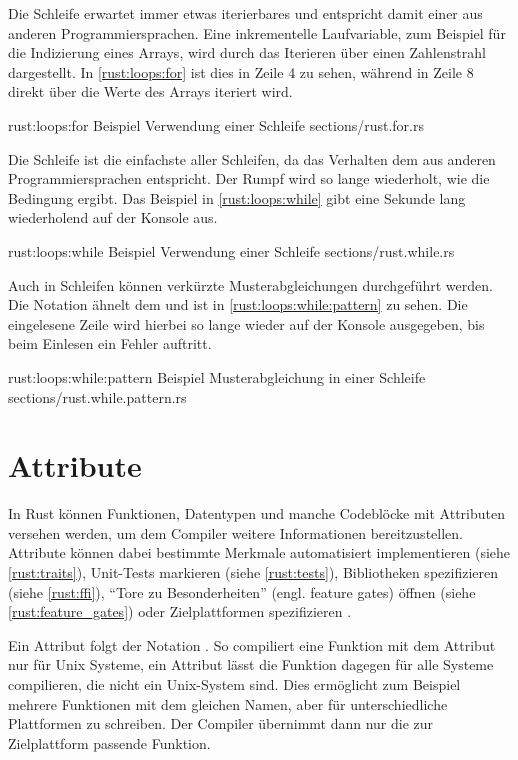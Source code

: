 Die  Schleife erwartet immer etwas iterierbares und entspricht damit einer  aus anderen Programmiersprachen.
Eine inkrementelle Laufvariable, zum Beispiel für die Indizierung eines Arrays, wird durch das Iterieren über einen Zahlenstrahl dargestellt.
In \autoref{rust:loops:for} ist dies in Zeile 4 zu sehen, während in Zeile 8 direkt über die Werte des Arrays iteriert wird.

\rustcinclude
	{rust:loops:for}
	{Beispiel Verwendung einer  Schleife}
	{sections/rust.for.rs}


Die  Schleife ist die einfachste aller Schleifen, da das Verhalten dem aus anderen Programmiersprachen entspricht.
Der Rumpf wird so lange wiederholt, wie die Bedingung  ergibt.
Das Beispiel in \autoref{rust:loops:while} gibt eine Sekunde lang wiederholend  auf der Konsole aus.


\rustcinclude
	{rust:loops:while}
	{Beispiel Verwendung einer  Schleife}
	{sections/rust.while.rs}

Auch in  Schleifen können verkürzte Musterabgleichungen durchgeführt werden.
Die Notation ähnelt dem  und ist in \autoref{rust:loops:while:pattern} zu sehen.
Die eingelesene Zeile wird hierbei so lange wieder auf der Konsole ausgegeben, bis beim Einlesen ein Fehler auftritt.

\rustcinclude
	{rust:loops:while:pattern}
	{Beispiel Musterabgleichung in einer  Schleife}
	{sections/rust.while.pattern.rs}

\section{Attribute}
\label{rust:attributes}

In Rust können Funktionen, Datentypen und manche Codeblöcke mit Attributen versehen werden, um dem Compiler weitere Informationen bereitzustellen.
Attribute können dabei bestimmte Merkmale automatisiert implementieren (siehe \autoref{rust:traits}), Unit-Tests markieren (siehe \autoref{rust:tests}), Bibliotheken spezifizieren (siehe \autoref{rust:ffi}), \enquote{Tore zu Besonderheiten} (engl. feature gates) öffnen (siehe \autoref{rust:feature_gates})  oder  Zielplattformen spezifizieren \cite{rust:book:attribute:cfg}.

Ein Attribut folgt der Notation . So compiliert eine Funktion mit dem Attribut  nur für Unix Systeme, ein Attribut  lässt die Funktion dagegen für alle Systeme compilieren, die nicht ein Unix-System sind.
Dies ermöglicht zum Beispiel mehrere Funktionen mit dem gleichen Namen, aber für unterschiedliche Plattformen zu schreiben.
Der Compiler übernimmt dann nur die zur Zielplattform passende Funktion.

